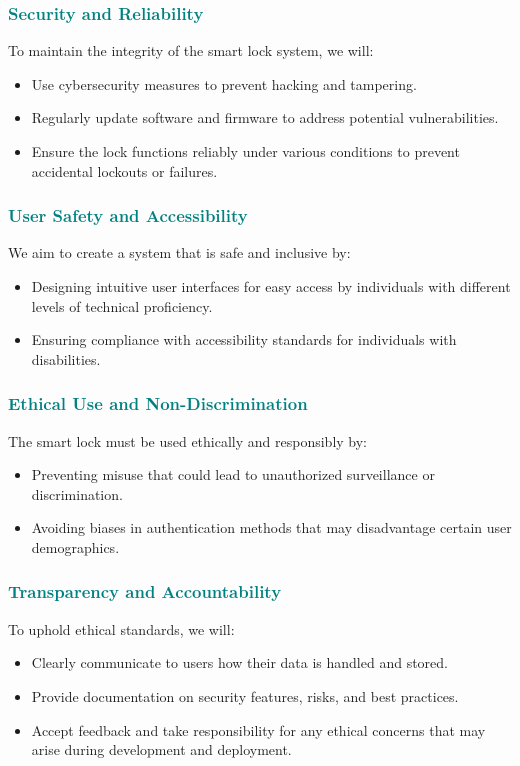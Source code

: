 \documentclass[a4paper,12pt]{report}
\begin{document}
\textcolor{teal}{\subsubsection{Security and Reliability}}
To maintain the integrity of the smart lock system, we will:
\begin{itemize}
    \item Use cybersecurity measures to prevent hacking and tampering.
    \item Regularly update software and firmware to address potential vulnerabilities.
    \item Ensure the lock functions reliably under various conditions to prevent accidental lockouts or failures.
\end{itemize}

\textcolor{teal}{\subsubsection{User Safety and Accessibility}}
We aim to create a system that is safe and inclusive by:
\begin{itemize}
    \item Designing intuitive user interfaces for easy access by individuals with different levels of technical proficiency.
    \item Ensuring compliance with accessibility standards for individuals with disabilities.
\end{itemize}

\textcolor{teal}{\subsubsection{Ethical Use and Non-Discrimination}}
The smart lock must be used ethically and responsibly by:
\begin{itemize}
    \item Preventing misuse that could lead to unauthorized surveillance or discrimination.
    \item Avoiding biases in authentication methods that may disadvantage certain user demographics.
\end{itemize}

\textcolor{teal}{\subsubsection{Transparency and Accountability}}
To uphold ethical standards, we will:
\begin{itemize}
    \item Clearly communicate to users how their data is handled and stored.
    \item Provide documentation on security features, risks, and best practices.
    \item Accept feedback and take responsibility for any ethical concerns that may arise during development and deployment.
\end{itemize}
\end{document}
